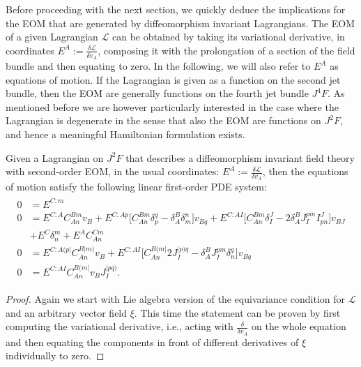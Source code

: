 Before proceeding with the next section, we quickly deduce the implications for the EOM that are generated by diffeomorphism invariant Lagrangians. The EOM of a given Lagrangian $\mathcal{L}$ can be obtained by taking its variational derivative, in coordinates $E^A := \frac{\delta \mathcal{L}}{\delta v_A}$, composing it with the prolongation of a section of the field bundle and then equating to zero. In the following, we will also refer to $E^A$ as equations of motion. If the Lagrangian is given as a function on the second jet bundle, then the EOM are generally functions on the fourth jet bundle $J^4F$. As mentioned before we are however particularly interested in the case where the Lagrangian is degenerate in the sense that also the EOM are functions on $J^2F$, and hence a meaningful Hamiltonian formulation exists.
\begin{theorem}
Given a Lagrangian on $J^2F$ that describes a diffeomorphism invariant field theory with second-order EOM, in the usual coordinates: $E^A := \frac{\delta \mathcal{L}}{\delta v_A}$, then the equations of motion satisfy the following linear first-order PDE system:
\begin{align}\label{EOM}
    \begin{aligned}
    0 &= E^{C:m} \\
    0 &= E^{C:A} C_{An}^{Bm} v_B + E^{C:Ap} \bigl[ C_{An}^{Bm} \delta_p^q - \delta_A^B \delta_m^n \bigr] v_{Bq} + E^{C:AI} \bigl[ C_{An}^{Bm} \delta_I^J - 2 \delta_A^B J_I^{pm} I^J_{pn}  \bigr] v_{BJ}\\
    &+ E^C \delta^m_n + E^A C_{An}^{Cm}  \\
    0 &= E^{C:A(p\vert}C_{An}^{B \vert m)} v_B + E^{C: AI} \bigl[ C_{An}^{B(m\vert} 2 J_I^{\vert p) q} - \delta^B_A J_I ^{pm} \delta_n^q \bigr] v_{Bq} \\
    0 &= E^{C:AI} C_{An}^{B(m\vert} v_B J_I^{\vert p q )}.
    \end{aligned}
\end{align}
\end{theorem}
\begin{proof}
Again we start with Lie algebra version of the equivariance condition for $\mathcal{L}$ and an arbitrary vector field $\xi$. This time the statement can be proven by first computing the variational derivative, i.e., acting with $\frac{\delta}{\delta v_A}$ on the whole equation and then equating the components in front of different derivatives of $\xi$ individually to zero. 
\end{proof}

